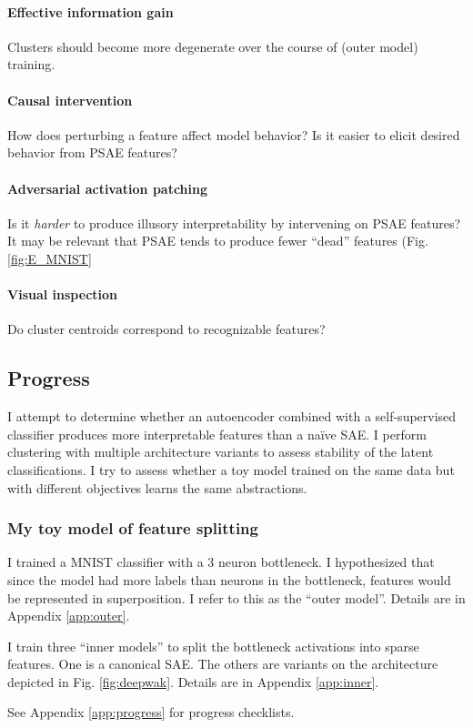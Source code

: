\paragraph{Effective information gain}
Clusters should become more degenerate over the course of (outer model) training.

\paragraph{Causal intervention}
How does perturbing a feature affect model behavior?
Is it easier to elicit desired behavior from PSAE features?

\paragraph{Adversarial activation patching}
Is it \textit{harder} to produce illusory interpretability by intervening on PSAE features?
It may be relevant that PSAE tends to produce fewer ``dead'' features (Fig. \ref{fig:E_MNIST}

\paragraph{Visual inspection}
Do cluster centroids correspond to recognizable features?

\subsection{Progress}
I attempt to determine whether an autoencoder combined with a self-supervised classifier produces more interpretable features than a na\"ive SAE.
I perform clustering with multiple architecture variants to assess stability of the latent classifications.
I try to assess whether a toy model trained on the same data but with different objectives learns the same abstractions.

\subsubsection{My toy model of feature splitting}
I trained a MNIST classifier with a 3 neuron bottleneck.
I hypothesized that since the model had more labels than neurons in the bottleneck, features would be represented in superposition.
I refer to this as the ``outer model''.
Details are in Appendix \ref{app:outer}.

I train three ``inner models'' to split the bottleneck activations into sparse features.
One is a canonical SAE. 
The others are variants on the architecture depicted in Fig. \ref{fig:deepwak}.
Details are in Appendix \ref{app:inner}.

See Appendix \ref{app:progress} for progress checklists.

